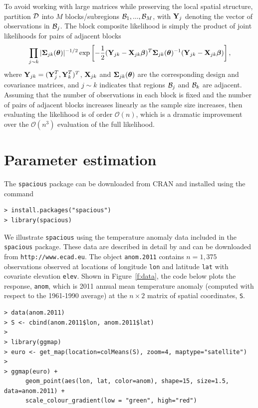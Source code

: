 \documentclass[11pt]{article}
\newcommand{\btheta}{ \mbox{\boldmath $\theta$}}
\newcommand{\bbeta}{ \mbox{\boldmath $\beta$}}
\newcommand{\bSigma}{ \mbox{\boldmath $\Sigma$}}
\newcommand{\bX}{ \mbox{\bf X}}
\newcommand{\bY}{ \mbox{\bf Y}}
\newcommand{\calD}{{\cal D}}
\newcommand{\calB}{{\cal B}}
\begin{document}
To avoid working with large matrices while preserving the local spatial structure, \cite{Eidsvik:2013} partition $\calD$ into $M$ blocks/subregions $\calB_1,...,\calB_M$, with $\bY_j$ denoting the vector of observations in $\calB_j$.
The block composite likelihood is simply the product of joint likelihoods for pairs of adjacent blocks
$$ \prod_{j\sim k}
    |\bSigma_{jk}(\btheta)|^{-1/2}\exp\left[-\frac{1}{2}(\bY_{jk}-\bX_{jk}\bbeta)^T\bSigma_{jk}(\btheta)^{-1}(\bY_{jk}-\bX_{jk}\bbeta)\right],$$
where $\bY_{jk} = (\bY_j^T, \bY_k^T)^T$, $\bX_{jk}$ and $\bSigma_{jk}(\btheta)$ are the corresponding design and covariance matrices, and $j\sim k$ indicates that regions $\calB_j$ and $\calB_k$ are adjacent.
Assuming that the number of observations in each block is fixed and the number of pairs of adjacent blocks increases linearly as the sample size increases, then evaluating the likelihood is of order $\mathcal{O}(n)$, which is a dramatic improvement over the $\mathcal{O}(n^3)$ evaluation of the full likelihood.

\section{Parameter estimation}\label{s:estimate}
The {\tt spacious} package can be downloaded from CRAN and installed using the command

\begin{verbatim}
> install.packages("spacious")
> library(spacious)
\end{verbatim}

We illustrate {\tt spacious} using the temperature anomaly data included in the {\tt spacious} package.
These data are described in detail by \cite{klein-2002a} and can be downloaded from {\tt http://www.ecad.eu}.
The object {\tt anom.2011} contains $n=1,375$ observations observed at locations of longitude {\tt lon} and latitude {\tt lat} with covariate elevation {\tt elev}.
Shown in Figure~\ref{f:data}, the code below plots the response, {\tt anom}, which is 2011 annual mean temperature anomaly (computed with respect to the 1961-1990 average) at the $n\times 2$ matrix of spatial coordinates, {\tt S}.

\begin{verbatim}
> data(anom.2011)
> S <- cbind(anom.2011$lon, anom.2011$lat)
>
> library(ggmap)
> euro <- get_map(location=colMeans(S), zoom=4, maptype="satellite")
> 
> ggmap(euro) +
      geom_point(aes(lon, lat, color=anom), shape=15, size=1.5, data=anom.2011) +
      scale_colour_gradient(low = "green", high="red")
\end{verbatim}
\end{document}

